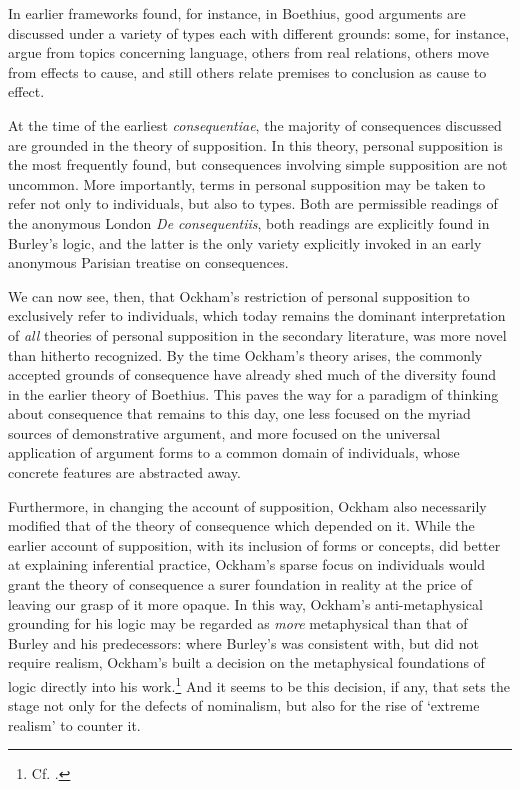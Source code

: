 \documentclass[a4paper, 11pt]{article}
\begin{document}
In earlier frameworks found, for instance, in Boethius, good arguments are discussed under a variety of types each with different grounds: some, for instance, argue from topics concerning language, others from real relations, others move from effects to cause, and still others relate premises to conclusion as cause to effect.

At the time of the earliest \emph{consequentiae}, the majority of consequences discussed are grounded in the theory of supposition. In this theory, personal supposition is the most frequently found, but consequences involving simple supposition are not uncommon. More importantly, terms in personal supposition may be taken to refer not only to individuals, but also to types. Both are permissible readings of the anonymous London \emph{De consequentiis}, both readings are explicitly found in Burley's logic, and the latter is the only variety explicitly invoked in an early anonymous Parisian treatise on consequences.

We can now see, then, that Ockham's restriction of personal supposition to exclusively refer to individuals, which today remains the dominant interpretation of \emph{all} theories of personal supposition in the secondary literature, was more novel than hitherto recognized. By the time Ockham's theory arises, the commonly accepted grounds of consequence have already shed much of the diversity found in the earlier theory of Boethius. This paves the way for a paradigm of thinking about consequence that remains to this day, one less focused on the myriad sources of demonstrative argument, and more focused on the universal application of argument forms to a common domain of individuals, whose concrete features are abstracted away. 

Furthermore, in changing the account of supposition, Ockham also necessarily modified that of the theory of consequence which depended on it. While the earlier account of supposition, with its inclusion of forms or concepts, did better at explaining inferential practice, Ockham's sparse focus on individuals would grant the theory of consequence a surer foundation in reality at the price of leaving our grasp of it more opaque. In this way, Ockham's anti-metaphysical grounding for his logic may be regarded as \emph{more} metaphysical than that of Burley and his predecessors: where Burley's was consistent with, but did not require realism, Ockham's built a decision on the metaphysical foundations of logic directly into his work.\footnote{Cf. \autocite{Read2007}.} And it seems to be this decision, if any, that sets the stage not only for the defects of nominalism, but also for the rise of `extreme realism' to counter it.
\end{document}
